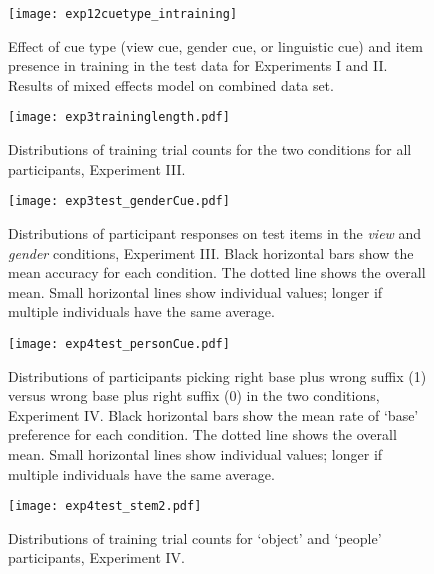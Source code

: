 \documentclass{frontiersSCNS} %
\begin{document}
\begin{figure}[ht]
\begin{center}
\texttt{[image: exp12cuetype\_intraining]}
\end{center}
\caption{ \large Effect of cue type (view cue, gender cue, or linguistic cue) and item presence in training in the test data for Experiments I and II. Results of mixed effects model on combined data set. }
\label{exp12intplot}
\end{figure}


\begin{figure}[ht]
\begin{center}
\texttt{[image: exp3traininglength.pdf]}
\caption{ \large  Distributions of training trial counts for the two conditions for all participants, Experiment III.}
\label{traininglength3}
\end{center}
\end{figure}

\begin{figure}[ht]
\begin{center}
\texttt{[image: exp3test\_genderCue.pdf]}
\caption{ \large Distributions of participant responses on test items in the \emph{view} and \emph{gender} conditions, Experiment III. Black horizontal bars show the mean accuracy for each condition. The dotted line shows the overall mean. Small horizontal lines show individual values; longer if multiple individuals have the same average.}
\label{test31}
\end{center}
\end{figure}

\begin{figure}[ht]
\begin{center}
\texttt{[image: exp4test\_personCue.pdf]}
\caption{ \large Distributions of participants picking right base plus wrong suffix (1) versus wrong base plus right suffix (0) in the two conditions, Experiment IV. Black horizontal bars show the mean rate of `base' preference for each condition. The dotted line shows the overall mean. Small horizontal lines show individual values; longer if multiple individuals have the same average.}
\label{exp4test}
\end{center}
\end{figure}

\begin{figure}[ht]
\begin{center}
\texttt{[image: exp4test\_stem2.pdf]}
\caption{ \large Distributions of training trial counts for `object' and `people' participants, Experiment IV.}
\label{exp4people}
\end{center}
\end{figure}
\end{document}
